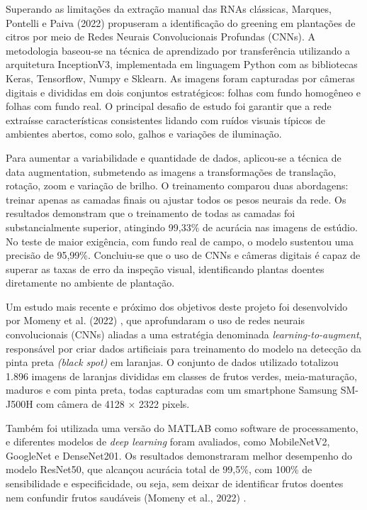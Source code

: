 \documentclass[11pt,a4paper]{article}
\begin{document}
Superando as limitações da extração manual das RNAs clássicas, Marques, Pontelli e Paiva (2022) \cite{Marques2022} propuseram a identificação do greening em plantações de citros por meio de Redes Neurais Convolucionais Profundas (CNNs). A metodologia baseou-se na técnica de aprendizado por transferência utilizando a arquitetura InceptionV3, implementada em linguagem Python com as bibliotecas Keras, Tensorflow, Numpy e Sklearn. As imagens foram capturadas por câmeras digitais e divididas em dois conjuntos estratégicos: folhas com fundo homogêneo e folhas com fundo real. O principal desafio de estudo foi garantir que a rede extraísse características consistentes lidando com ruídos visuais típicos de ambientes abertos, como solo, galhos e variações de iluminação.

Para aumentar a variabilidade e quantidade de dados, aplicou-se a técnica de data augmentation, submetendo as imagens a transformações de translação, rotação, zoom e variação de brilho. O treinamento comparou duas abordagens: treinar apenas as camadas finais ou ajustar todos os pesos neurais da rede. Os resultados demonstram que o treinamento de todas as camadas foi substancialmente superior, atingindo 99,33\% de acurácia nas imagens de estúdio. No teste de maior exigência, com fundo real de campo, o modelo sustentou uma precisão de 95,99\%. Concluiu-se que o uso de CNNs e câmeras digitais é capaz de superar as taxas de erro da inspeção visual, identificando plantas doentes diretamente no ambiente de plantação. 

Um estudo mais recente e próximo dos objetivos deste projeto foi desenvolvido por Momeny et al. (2022) \cite{Momeny2022}, que aprofundaram o uso de redes neurais convolucionais (CNNs) aliadas a uma estratégia denominada \emph{learning-to-augment}, responsável por criar dados artificiais para treinamento do modelo na detecção da pinta preta \emph{(black spot)} em laranjas. O conjunto de dados utilizado totalizou 1.896 imagens de laranjas divididas em classes de frutos verdes, meia-maturação, maduros e com pinta preta, todas capturadas com um smartphone Samsung SM-J500H com câmera de 4128 × 2322 pixels.

Também foi utilizada uma versão do MATLAB como software de processamento, e diferentes modelos de \emph{deep learning} foram avaliados, como MobileNetV2, GoogleNet e DenseNet201. Os resultados demonstraram melhor desempenho do modelo ResNet50, que alcançou acurácia total de 99,5\%, com 100\% de sensibilidade e especificidade, ou seja, sem deixar de identificar frutos doentes nem confundir frutos saudáveis (Momeny et al., 2022) \cite{Momeny2022}.
\end{document}
